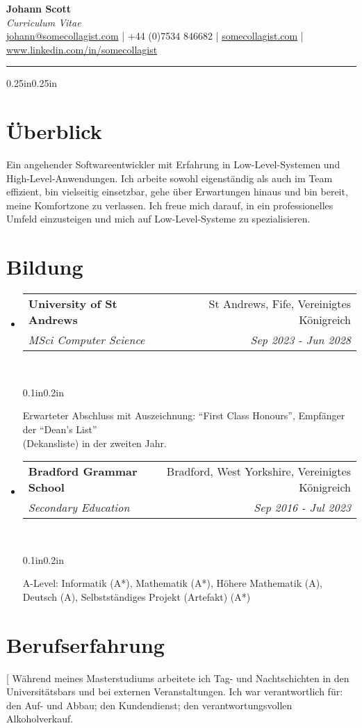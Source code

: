 \documentclass[a4paper]{article}
\makeatletter
\newcommand{\emailaddr}{johann@somecollagist.com}
\newcommand{\phonenumber}{+44 (0)7534 846682}
\newcommand{\website}{somecollagist.com}
\newcommand{\linkedin}{www.linkedin.com/in/somecollagist}
\newcommand{\resumeSubheading}[5][]{
  \vspace{2pt}\item
    \begin{tabular*}{0.875\textwidth}[t]{l@{\extracolsep{\fill}}r}
      \textbf{#2} & #3 \\
      \textit{\small#4} & \textit{\small #5} \\
    \end{tabular*}\\
    \vspace{-5pt}
    \begin{adjustwidth}{0.1in}{0.2in}
      #1
    \end{adjustwidth}
    \vspace{10pt}
}
\newcommand{\resumeSubheadingList}[1]{
  \begin{itemize}
    #1
  \end{itemize}
}
\makeatother
\begin{document}
\begin{center}
  \huge \textbf{Johann Scott} \\
  \normalsize \textit{Curriculum Vitae} \\
  \vspace{1em}
  {
    \href{mailto:\emailaddr}{\emailaddr} {|}
    {\phonenumber} {|}
    \href{https://\website}{\website} {|}
    \href{https://\linkedin}{\linkedin}
  } \\
  \vspace{1em}
  \rule{\linewidth}{1pt}
\end{center}

\begin{adjustwidth}{0.25in}{0.25in}

  \section{Überblick}
  Ein angehender Softwareentwickler mit Erfahrung in Low-Level-Systemen und
  High-Level-Anwendungen. Ich arbeite sowohl eigenständig als auch im Team
  effizient, bin vielseitig einsetzbar, gehe über Erwartungen hinaus und bin
  bereit, meine Komfortzone zu verlassen. Ich freue mich darauf, in ein
  professionelles Umfeld einzusteigen und mich auf Low-Level-Systeme zu
  spezialisieren.

  \section{Bildung}
    \resumeSubheadingList{
      \resumeSubheading[
        Erwarteter Abschluss mit Auszeichnung: ``First Class Honours'', Empfänger
        der ``Dean's List'' \\ (Dekansliste) in der zweiten Jahr.
      ]
        {University of St Andrews}
        {St Andrews, Fife, Vereinigtes Königreich}
        {MSci Computer Science}
        {Sep 2023 {-} Jun 2028}
      \resumeSubheading[
        A-Level: Informatik (A*), Mathematik (A*), Höhere
        Mathematik (A), Deutsch (A), Selbstständiges Projekt (Artefakt) (A*)
      ]
        {Bradford Grammar School}
        {Bradford, West Yorkshire, Vereinigtes Königreich}
        {Secondary Education}
        {Sep 2016 {-} Jul 2023}
    }

  \section{Berufserfahrung}
    \resumeSubheadingList{
      \resumeSubheading[
        Während meines Masterstudiums arbeitete ich Tag- und Nachtschichten in
        den Universitätsbars und bei externen Veranstaltungen. Ich war
        verantwortlich für: den Auf- und Abbau; den Kundendienst; den
        verantwortungsvollen Alkoholverkauf.

}
\end{adjustwidth}
\end{document}
